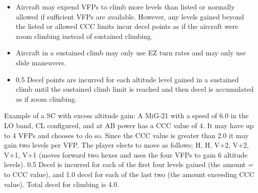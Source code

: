 {\begin{itemize}
    \item{} Aircraft may expend VFPs to climb more levels than listed or normally allowed if sufficient VFPs are available. However, any levels gained beyond the listed or allowed CCC limits incur decel points as if the aircraft were zoom climbing instead of sustained climbing.

    \item{} Aircraft in a sustained climb may only use EZ turn rates  and may only use slide maneuvers.

    \item{} 0.5 Decel points are incurred for each altitude level gained in a sustained climb until the sustained climb limit is reached and then decel is accumulated as if zoom climbing. 



\end{itemize}

Example of a SC with excess altitude gain: A MiG-21 with a speed of 6.0 in the LO band, CL configured, and at AB power has a CCC value of 4. It may have up to 4 VFPs and chooses to do so. Since the CCC value is greater than 2.0 it may gain two levels per VFP. The player elects to move as follows; H, H, V+2, V+2, V+1, V+1 (moves forward two hexes and uses the four VFPs to gain 6 altitude levels). 0.5 Decel is incurred for each of the first four levels gained (the amount = to CCC value), and 1.0 decel for each of the last two (the amount exceeding CCC value). Total decel for climbing is 4.0.

}
